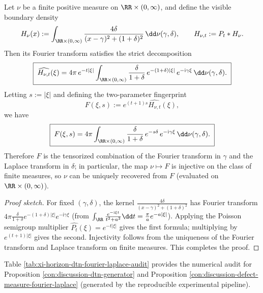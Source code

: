 \begin{proposition}\label{con:discussion-defect-measure-fourier-laplace}
Let \(\nu\) be a finite positive measure on \(\RR\times(0,\infty)\), and define the visible boundary density
\[
H_\nu(x):=\int_{\RR\times(0,\infty)}\frac{4\delta}{(x-\gamma)^2+(1+\delta)^2}\,\dd\nu(\gamma,\delta),
\qquad
H_{\nu,t}:=P_t*H_\nu.
\]
Then its Fourier transform satisfies the strict decomposition
\[
\boxed{\;
\widehat{H_{\nu,t}}(\xi)
=4\pi\,e^{-t|\xi|}
\int_{\RR\times(0,\infty)}
\frac{\delta}{1+\delta}\,
e^{-(1+\delta)|\xi|}\,e^{-\mathrm{i}\gamma\xi}\,\dd\nu(\gamma,\delta).\;}
\]
Letting \(s:=|\xi|\) and defining the two-parameter fingerprint
\[
F(\xi,s):=e^{(t+1)s}\widehat{H_{\nu,t}}(\xi),
\]
we have
\[
\boxed{\;
F(\xi,s)
=4\pi\int_{\RR\times(0,\infty)}\frac{\delta}{1+\delta}\,e^{-s\delta}\,e^{-\mathrm{i}\gamma\xi}\,\dd\nu(\gamma,\delta).\;}
\]
Therefore \(F\) is the tensorized combination of the Fourier transform in \(\gamma\) and the Laplace transform in \(\delta\); in particular, the map \(\nu\mapsto F\) is injective on the class of finite measures, so \(\nu\) can be uniquely recovered from \(F\) (evaluated on \(\RR\times(0,\infty)\)).
\end{proposition}
\begin{proof}[Proof sketch]
For fixed \((\gamma,\delta)\), the kernel \(\frac{4\delta}{(x-\gamma)^2+(1+\delta)^2}\) has Fourier transform \(4\pi\frac{\delta}{1+\delta}e^{-(1+\delta)|\xi|}e^{-\mathrm{i}\gamma\xi}\) (from \(\int_{\RR}\frac{e^{-\mathrm{i}\xi t}}{t^2+a^2}\dd t=\frac{\pi}{a}e^{-a|\xi|}\)).
Applying the Poisson semigroup multiplier \(\widehat{P_t}(\xi)=e^{-t|\xi|}\) gives the first formula; multiplying by \(e^{(t+1)|\xi|}\) gives the second.
Injectivity follows from the uniqueness of the Fourier transform and Laplace transform on finite measures. This completes the proof.
\end{proof}

Table \ref{tab:xi-horizon-dtn-fourier-laplace-audit} provides the numerical audit for Proposition \ref{con:discussion-dtn-generator} and Proposition \ref{con:discussion-defect-measure-fourier-laplace} (generated by the reproducible experimental pipeline).


